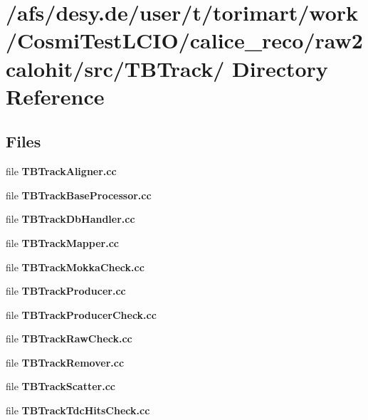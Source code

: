\section{/afs/desy.de/user/t/torimart/work/CosmiTestLCIO/calice\_\-reco/raw2calohit/src/TBTrack/ Directory Reference}
\label{dir_8c5a68ce56bcfaf1f187b88f95b337f2}
\subsection*{Files}
\begin{DoxyCompactItemize}
\item 
file {\bfseries TBTrackAligner.cc}
\item 
file {\bfseries TBTrackBaseProcessor.cc}
\item 
file {\bfseries TBTrackDbHandler.cc}
\item 
file {\bfseries TBTrackMapper.cc}
\item 
file {\bfseries TBTrackMokkaCheck.cc}
\item 
file {\bfseries TBTrackProducer.cc}
\item 
file {\bfseries TBTrackProducerCheck.cc}
\item 
file {\bfseries TBTrackRawCheck.cc}
\item 
file {\bfseries TBTrackRemover.cc}
\item 
file {\bfseries TBTrackScatter.cc}
\item 
file {\bfseries TBTrackTdcHitsCheck.cc}
\end{DoxyCompactItemize}
